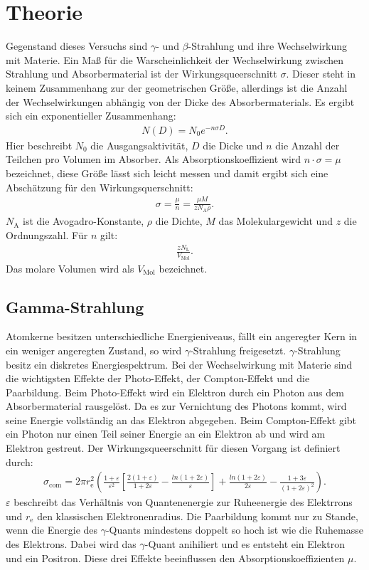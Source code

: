 \section{Theorie}
\label{sec:Theorie}
Gegenstand dieses Versuchs sind $\gamma$- und $\beta$-Strahlung und ihre Wechselwirkung mit Materie.
Ein Maß für die Warscheinlichkeit der Wechselwirkung zwischen Strahlung und Absorbermaterial ist der
Wirkungsqueerschnitt $\sigma$. Dieser steht in keinem Zusammenhang zur der geometrischen Größe, allerdings
ist die Anzahl der Wechselwirkungen abhängig von der Dicke des Absorbermaterials. Es ergibt sich ein
exponentieller Zusammenhang:
\begin{align}
N(D)=N_\mathrm{0}e^{-n\sigma D}.\label{eqn:abs}
\end{align}
Hier beschreibt $N_\mathrm{0}$ die Ausgangsaktivität, $D$ die Dicke und $n$ die Anzahl der Teilchen pro
Volumen im Absorber. Als Absorptionskoeffizient wird $n\cdot\sigma=\mu$ bezeichnet, diese Größe lässt sich
leicht messen und damit ergibt sich eine Abschätzung für den Wirkungsquerschnitt:
\begin{align}
\sigma=\frac{\mu}{n}=\frac{\mu M}{zN_\mathrm{A}\rho}.
\end{align}
$N_\mathrm{A}$ ist die Avogadro-Konstante, $\rho$ die Dichte, $M$ das Molekulargewicht und $z$ die Ordnungszahl.
Für $n$ gilt:
\begin{align}
\frac{zN_\mathrm{L}}{V_\mathrm{Mol}}.
\end{align}
Das molare Volumen wird als $V_\mathrm{Mol}$ bezeichnet.
\subsection{Gamma-Strahlung}
Atomkerne besitzen unterschiedliche Energieniveaus, fällt ein angeregter Kern in ein weniger angeregten Zustand, so
wird $\gamma$-Strahlung freigesetzt. $\gamma$-Strahlung besitz ein diskretes Energiespektrum.
Bei der Wechselwirkung mit Materie sind die wichtigsten Effekte der Photo-Effekt, der Compton-Effekt und
die Paarbildung.
Beim Photo-Effekt wird ein Elektron durch ein Photon aus dem Absorbermaterial rausgelöst. Da es zur Vernichtung des
Photons kommt, wird seine Energie vollständig an das Elektron abgegeben.
Beim Compton-Effekt gibt ein Photon nur einen Teil seiner Energie an ein Elektron ab und wird am Elektron gestreut.
Der Wirkungsqueerschnitt für diesen Vorgang ist definiert durch:
\begin{align}
\sigma_\mathrm{com}=2\pi r_\mathrm{e}^2\left(\frac{1+\varepsilon}{\varepsilon^2}\left[\frac{2(1+\varepsilon)}{1+2\varepsilon}-\frac{ln(1+2\varepsilon)}{\varepsilon}\right]+\frac{ln(1+2\varepsilon)}{2\varepsilon}-\frac{1+3\varepsilon}{(1+2\varepsilon)^2}\right)\label{eqn:sigma}.
\end{align}
$\varepsilon$ beschreibt das Verhältnis von Quantenenergie zur Ruheenergie des Elektrrons und $r_\mathrm{e}$
den klassischen Elektronenradius.
Die Paarbildung kommt nur zu Stande, wenn die Energie des $\gamma$-Quants mindestens doppelt so hoch ist wie
die Ruhemasse des Elektrons. Dabei wird das $\gamma$-Quant anihiliert und es entsteht ein Elektron und ein Positron.
Diese drei Effekte beeinflussen den Absorptionskoeffizienten $\mu$.
